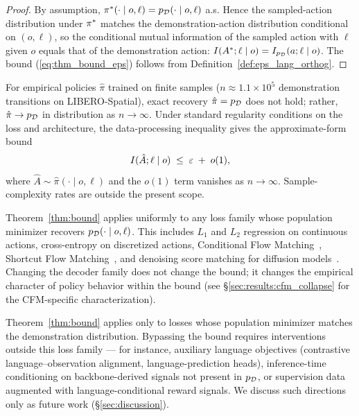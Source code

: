 \begin{proof}[Proof]
By assumption, $\pi^{*}(\cdot \mid o, \ell) = p_{\mathcal{D}}(\cdot \mid o, \ell)$ a.s. Hence the
sampled-action distribution under $\pi^{*}$ matches the demonstration-action distribution
conditional on $(o, \ell)$, so the conditional mutual information of the sampled action
with $\ell$ given $o$ equals that of the demonstration action: $I(A^{*}; \ell \mid o) =
I_{p_{\mathcal{D}}}(a; \ell \mid o)$. The bound (\ref{eq:thm_bound_eps}) follows from
Definition~\ref{def:eps_lang_orthog}.
\end{proof}

\begin{remark}
\label{rem:approx_bound}
For empirical policies $\hat\pi$ trained on finite samples ($n \approx 1.1 \times 10^{5}$
demonstration transitions on LIBERO-Spatial), exact recovery $\hat\pi = p_{\mathcal{D}}$ does not
hold; rather, $\hat\pi \to p_{\mathcal{D}}$ in distribution as $n \to \infty$. Under standard
regularity conditions on the loss and architecture, the data-processing inequality gives
the approximate-form bound
\begin{equation}
I(\hat A; \ell \mid o) \;\le\; \varepsilon \;+\; o(1),
\label{eq:approx_bound}
\end{equation}
where $\hat A \sim \hat\pi(\cdot \mid o, \ell)$ and the $o(1)$ term vanishes as $n \to
\infty$. Sample-complexity rates are outside the present scope.
\end{remark}

\begin{remark}
\label{rem:arch_agnostic}
Theorem~\ref{thm:bound} applies uniformly to any loss family whose population minimizer
recovers $p_{\mathcal{D}}(\cdot \mid o, \ell)$. This includes $L_1$ and $L_2$ regression on
continuous actions, cross-entropy on discretized actions, Conditional Flow
Matching~\cite{lipman2023flow_matching}, Shortcut Flow Matching~\cite{frans2024shortcut},
and denoising score matching for diffusion models~\cite{chi2023diffusion}. Changing the
decoder family does not change the bound; it changes the empirical character of policy
behavior within the bound (see \S\ref{sec:results:cfm_collapse} for the CFM-specific
characterization).
\end{remark}

\begin{remark}
\label{rem:bypass}
Theorem~\ref{thm:bound} applies only to losses whose population minimizer matches the
demonstration distribution. Bypassing the bound requires interventions outside this loss
family --- for instance, auxiliary language objectives (contrastive
language--observation alignment, language-prediction heads), inference-time conditioning
on backbone-derived signals not present in $p_{\mathcal{D}}$, or supervision data augmented with
language-conditional reward signals. We discuss such directions only as future work
(\S\ref{sec:discussion}).
\end{remark}
